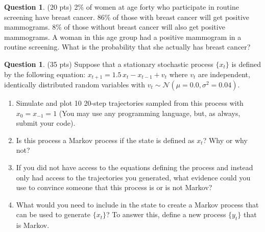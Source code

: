 \documentclass{article}
\theoremstyle{definition}
\newtheorem{question}[thm]{Question}
\begin{document}

\begin{question} (20 pts)
    2\% of women at age forty who participate in routine screening have breast cancer. 86\% of those with breast cancer will get positive mammograms. 8\% of those without breast cancer will also get positive mammograms. A woman in this age group had a positive mammogram in a routine screening. What is the probability that she actually has breast cancer?
\end{question}

\begin{question} (35 pts)
Suppose that a stationary stochastic process $\{x_t\}$ is defined by the following equation: $x_{t+1} = 1.5 \, x_t - x_{t-1} + v_{t}$ where $v_t$ are independent, identically distributed random variables with $v_t \sim \mathcal{N}(\mu=0.0, \sigma^2=0.04)$.
    \begin{enumerate}[nosep,label=(\alph*)]
        \item Simulate and plot 10 20-step trajectories sampled from this process with $x_0 = x_{-1} = 1$ (You may use any programming language, but, as always, submit your code).
        \item Is this process a Markov process if the state is defined as $x_t$? Why or why not?
        \item If you did not have access to the equations defining the process and instead only had access to the trajectories you generated, what evidence could you use to convince someone that this process is or is not Markov?
        \item What would you need to include in the state to create a Markov process that can be used to generate $\{x_t\}$? To answer this, define a new process $\{y_t\}$ that is Markov.
    \end{enumerate}
\end{question}
\end{document}
